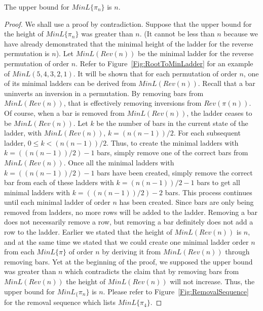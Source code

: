    \begin{lemma}
       The upper bound for $MinL\{\pi_{n}\}$ is $n$.
   \end{lemma}
   \begin{proof}
       We shall use a proof by contradiction. Suppose that the upper bound for the height of $MinL\{\pi_{n}\}$ was greater than $n$. (It cannot be less than $n$ because 
       we have already demonstrated that the minimal height of the ladder for the reverse permutation is $n$). Let $MinL(Rev(n))$ be the 
       minimal ladder for the reverse permutation of order $n$. Refer to Figure~\ref{Fig:RootToMinLadder} for an example of $MinL(5,4,3,2,1)$. 
       It will be shown that for each permutation of order $n$, one of its minimal ladders can be derived from $MinL(Rev(n))$.
       Recall that a bar uninverts an inversion in a permutation. By removing bars from $MinL(Rev(n))$, that is effectively removing 
       inversions from $Rev(\pi(n))$. Of course, when a bar is removed from  $MinL(Rev(n))$, the ladder ceases to be $MinL(Rev(n))$. 
       Let $k$ be the number of bars in the current state of the ladder, with $MinL(Rev(n))$, $k=(n(n-1))/2$. For each subsequent 
       ladder, $0 \leq k < (n(n-1))/2$. Thus, to create the minimal ladders with $k=((n(n-1))/2)-1$ bars, 
       simply remove one of the correct bars from $MinL(Rev(n))$. 
       Once all the minimal ladders with  $k=((n(n-1))/2)-1$ bars have been created, simply remove the correct bar from each of these ladders with 
        $k=(n(n-1))/2-1$ bars to get all minimal ladders with  $k=((n(n-1))/2)-2$ bars.
       This process continues until each minimal ladder of order $n$ has been created. 
       Since bars are only being removed from ladders, no more rows 
       will be added to the ladder. 
       Removing a bar does not necessarily remove a row, but removing a bar definitely does not add a row to the ladder. 
       Earlier we stated that 
       the height of $MinL(Rev(n))$ is $n$, and at the same time we stated that we could create one minimal ladder order $n$ 
       from each $MinL\{\pi\}$ of order $n$
       by deriving it from $MinL(Rev(n))$ 
       through removing bars. Yet at the beginning of the proof, 
       we supposed the upper bound was greater than $n$ which contradicts the claim that by removing bars from  
       $MinL(Rev(n))$ the height of $MinL(Rev(n))$ will not increase. Thus, the upper bound for $MinL_\{\pi_{n}\}$ is $n$. 
       Please refer to Figure~\ref{Fig:RemovalSequence} for the removal sequence which lists $MinL\{\pi_{4}\}$. 

   \end{proof}\pagebreak

